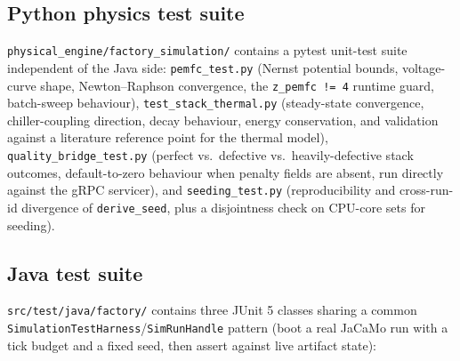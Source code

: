 \documentclass[twocolumn,10pt,a4paper]{article}
\newcommand{\code}[1]{\texttt{\small #1}}
\newcommand{\file}[1]{\texttt{#1}}
\begin{document}
\subsection{Python physics test suite}
\file{physical\_engine/factory\_simulation/} contains a pytest unit-test suite independent of the Java side: \code{pemfc\_test.py} (Nernst potential bounds, voltage-curve shape, Newton--Raphson convergence, the \code{z\_pemfc != 4} runtime guard, batch-sweep behaviour), \code{test\_stack\_thermal.py} (steady-state convergence, chiller-coupling direction, decay behaviour, energy conservation, and validation against a literature reference point for the thermal model), \code{quality\_bridge\_test.py} (perfect vs.\ defective vs.\ heavily-defective stack outcomes, default-to-zero behaviour when penalty fields are absent, run directly against the gRPC servicer), and \code{seeding\_test.py} (reproducibility and cross-run-id divergence of \code{derive\_seed}, plus a disjointness check on CPU-core sets for seeding).

\subsection{Java test suite}
\label{sec:java-tests}
\file{src/test/java/factory/} contains three JUnit 5 classes sharing a common \code{SimulationTestHarness}/\code{SimRunHandle} pattern (boot a real JaCaMo run with a tick budget and a fixed seed, then assert against live artifact state):
\end{document}
